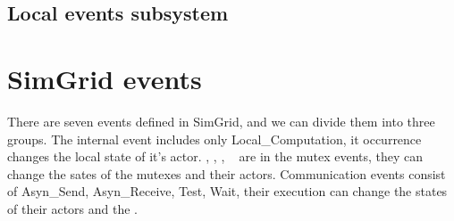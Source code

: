 \documentclass[a4paper,11pt]{article}
\begin{document}
\subsection{Local events subsystem}

\section{SimGrid events}
There are seven events defined in SimGrid, and we can divide them into three groups. The internal event includes only Local\_Computation, it occurrence changes the local state of it's actor. \mutexlock, \mutexunlock, \mutextest, \mutexwait~ are in the mutex events, they can change the sates of the mutexes and their actors. Communication events consist of Asyn\_Send, Asyn\_Receive, Test, Wait, their execution can change the states of their actors and the \Mailboxes.  \\
\end{document}
